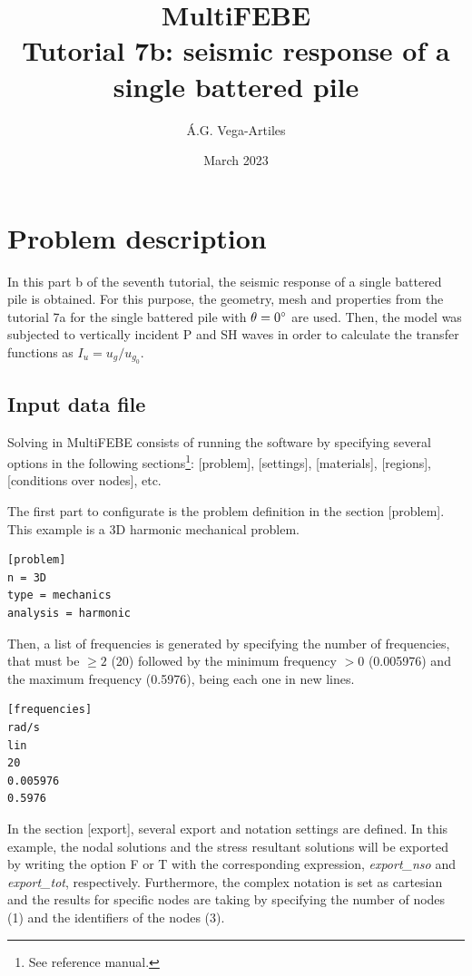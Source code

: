 \documentclass[a4]{article}
\title{MultiFEBE \\ Tutorial 7b: seismic response of a single battered pile}
\author{\'A.G. Vega-Artiles}
\date{March 2023}
\begin{document}
\maketitle

\tableofcontents

\section{Problem description}

In this part b of the seventh tutorial, the seismic response of a single battered pile is obtained. For this purpose, the geometry, mesh and properties from the tutorial 7a for the single battered pile with $\theta=0\degree$ are used. Then, the model was subjected to vertically incident P and SH waves in order to calculate the transfer functions as $I_u=u_g/u_{g_0}$.

\subsection{Input data file}
Solving in MultiFEBE consists of running the software by specifying several options in the following sections\footnote{See reference manual.}: [problem], [settings], [materials], [regions], [conditions over nodes], etc.

The first part to configurate is the problem definition in the section [problem]. This example is a 3D harmonic mechanical problem.

\begin{Verbatim}	
[problem]
n = 3D
type = mechanics
analysis = harmonic
\end{Verbatim}

Then, a list of frequencies is generated by specifying the number of frequencies, that must be $\geq 2$ (20) followed by the minimum frequency $>0$ (0.005976) and the maximum frequency (0.5976), being each one in new lines.

\begin{Verbatim}
[frequencies]
rad/s
lin
20
0.005976
0.5976
\end{Verbatim}

In the section [export], several export and notation settings are defined. In this example, the nodal solutions and the stress resultant solutions will be exported by writing the option F or T with the corresponding expression, \textit{export\_nso} and \textit{export\_tot}, respectively. Furthermore, the complex notation is set as cartesian and the results for specific nodes are taking by specifying the number of nodes (1) and the identifiers of the nodes (3). 
\end{document}
